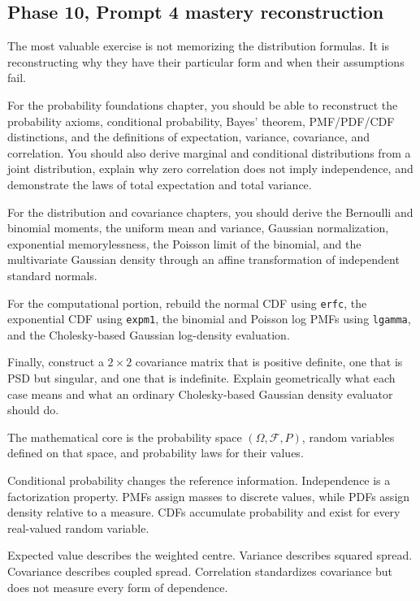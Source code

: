 \subsection{Phase 10, Prompt 4 mastery reconstruction}\label{02-foundations-ii-ch031-phase-10-prompt-4-mastery-reconstruction}

\hypertarget{02-foundations-ii-ch031-phase-10-prompt-4-mastery-reconstruction}{}

The most valuable exercise is not memorizing the distribution formulas. It is reconstructing why they have their particular form and when their assumptions fail.

For the probability foundations chapter, you should be able to reconstruct the probability axioms, conditional probability, Bayes' theorem, PMF/PDF/CDF distinctions, and the definitions of expectation, variance, covariance, and correlation. You should also derive marginal and conditional distributions from a joint distribution, explain why zero correlation does not imply independence, and demonstrate the laws of total expectation and total variance.

For the distribution and covariance chapters, you should derive the Bernoulli and binomial moments, the uniform mean and variance, Gaussian normalization, exponential memorylessness, the Poisson limit of the binomial, and the multivariate Gaussian density through an affine transformation of independent standard normals.

For the computational portion, rebuild the normal CDF using \texttt{erfc}, the exponential CDF using \texttt{expm1}, the binomial and Poisson log PMFs using \texttt{lgamma}, and the Cholesky-based Gaussian log-density evaluation.

Finally, construct a \(2\times2\) covariance matrix that is positive definite, one that is PSD but singular, and one that is indefinite. Explain geometrically what each case means and what an ordinary Cholesky-based Gaussian density evaluator should do.

The mathematical core is the probability space \((\Omega,\mathcal F,P)\), random variables defined on that space, and probability laws for their values.

Conditional probability changes the reference information. Independence is a factorization property. PMFs assign masses to discrete values, while PDFs assign density relative to a measure. CDFs accumulate probability and exist for every real-valued random variable.

Expected value describes the weighted centre. Variance describes squared spread. Covariance describes coupled spread. Correlation standardizes covariance but does not measure every form of dependence.

